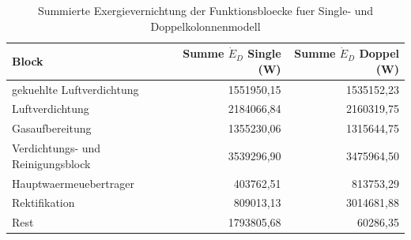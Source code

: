 \begin{longtable}{lrr}
\caption{Summierte Exergievernichtung der Funktionsbloecke fuer Single- und Doppelkolonnenmodell} \\
\hline
Block & Summe $\dot{E}_D$ Single (W) & Summe $\dot{E}_D$ Doppel (W) \\
\hline
gekuehlte Luftverdichtung & 1551950,15 & 1535152,23 \\
Luftverdichtung & 2184066,84 & 2160319,75 \\
Gasaufbereitung & 1355230,06 & 1315644,75 \\
Verdichtungs- und Reinigungsblock & 3539296,90 & 3475964,50 \\
Hauptwaermeuebertrager & 403762,51 & 813753,29 \\
Rektifikation & 809013,13 & 3014681,88 \\
Rest & 1793805,68 & 60286,35 \\
\hline
\end{longtable}
